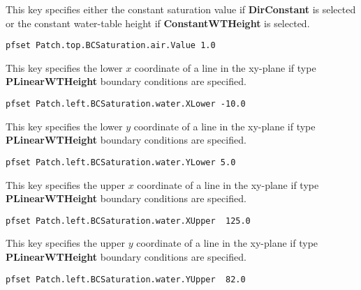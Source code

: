 {
This key specifies either the constant saturation value if
{\bf DirConstant} is selected or the constant water-table height if
{\bf ConstantWTHeight} is selected.
}
\begin{display}\begin{verbatim}
pfset Patch.top.BCSaturation.air.Value 1.0
\end{verbatim}\end{display}


{
This key specifies the lower $x$ coordinate of a line in the xy-plane if
type {\bf PLinearWTHeight} boundary conditions are specified.
}
\begin{display}\begin{verbatim}
pfset Patch.left.BCSaturation.water.XLower -10.0
\end{verbatim}\end{display}

{
This key specifies the lower $y$ coordinate of a line in the xy-plane if
type {\bf PLinearWTHeight} boundary conditions are specified.
}
\begin{display}\begin{verbatim}
pfset Patch.left.BCSaturation.water.YLower 5.0
\end{verbatim}\end{display}

{
This key specifies the upper $x$ coordinate of a line in the xy-plane if
type {\bf PLinearWTHeight} boundary conditions are specified.
}
\begin{display}\begin{verbatim}
pfset Patch.left.BCSaturation.water.XUpper  125.0
\end{verbatim}\end{display}

{
This key specifies the upper $y$ coordinate of a line in the xy-plane if
type {\bf PLinearWTHeight} boundary conditions are specified.
}
\begin{display}\begin{verbatim}
pfset Patch.left.BCSaturation.water.YUpper  82.0
\end{verbatim}\end{display}

